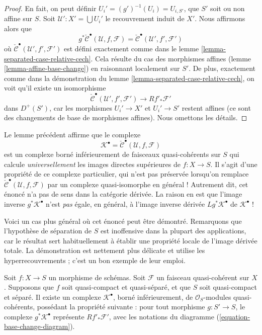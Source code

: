 \begin{proof}
En fait, on peut définir $U_i' = (g')^{-1}(U_i) = U_{i, S'}$,
que $S'$ soit ou non affine sur $S$.
Soit $\mathcal{U}' : X' = \bigcup U_i'$ le recouvrement induit de $X'$.
Nous affirmons alors que
$$
g^*\check{\mathcal{C}}^\bullet(\mathcal{U}, f, \mathcal{F})
=
\check{\mathcal{C}}^\bullet(\mathcal{U}', f', \mathcal{F}')
$$
où $\check{\mathcal{C}}^\bullet(\mathcal{U}', f', \mathcal{F}')$
est défini exactement comme dans le
lemme \ref{lemma-separated-case-relative-cech}.
Cela résulte du cas des morphismes affines
(lemme \ref{lemma-affine-base-change}) en raisonnant localement sur $S'$.
De plus, exactement comme dans la démonstration du
lemme \ref{lemma-separated-case-relative-cech},
on voit qu'il existe un isomorphisme
$$
\check{\mathcal{C}}^\bullet(\mathcal{U}', f', \mathcal{F}')
\longrightarrow
Rf'_*\mathcal{F}'
$$
dans $D^{+}(S')$, car les morphismes $U_i' \to X'$ et $U_i' \to S'$
restent affines (ce sont des changements de base de morphismes affines). Nous
omettons les détails.
\end{proof}

\noindent
Le lemme précédent affirme que le complexe
$$
\mathcal{K}^\bullet = \check{\mathcal{C}}^\bullet(\mathcal{U}, f, \mathcal{F})
$$
est un complexe borné inférieurement de faisceaux quasi-cohérents sur $S$ qui calcule
{\it universellement} les images directes supérieures de $f : X \to S$.
Il s'agit d'une propriété de ce complexe particulier,
qui n'est pas préservée lorsqu'on remplace
$\check{\mathcal{C}}^\bullet(\mathcal{U}, f, \mathcal{F})$ par
un complexe quasi-isomorphe en général ! Autrement dit, cet énoncé
n'a pas de sens dans la catégorie dérivée. La
raison en est que l'image inverse $g^*\mathcal{K}^\bullet$ n'est
{\it pas} égale, en général, à l'image inverse dérivée $Lg^*\mathcal{K}^\bullet$
de $\mathcal{K}^\bullet$ !

\medskip\noindent
Voici un cas plus général où cet énoncé peut être démontré.
Remarquons que l'hypothèse de séparation de $S$ est inoffensive dans la
plupart des applications, car le résultat sert habituellement à établir
une propriété locale de l'image dérivée
totale. La démonstration est nettement plus délicate et
utilise les hyperrecouvrements ; c'est un bon exemple de leur emploi.

\begin{lemma}
\label{lemma-hypercoverings}
Soit $f : X \to S$ un morphisme de schémas.
Soit $\mathcal{F}$ un faisceau quasi-cohérent sur $X$.
Supposons que $f$ soit quasi-compact et quasi-séparé, et
que $S$ soit quasi-compact et
séparé. Il existe un complexe $\mathcal{K}^\bullet$,
borné inférieurement, de $\mathcal{O}_S$-modules quasi-cohérents, possédant la
propriété suivante : pour tout morphisme
$g : S' \to S$, le complexe $g^*\mathcal{K}^\bullet$
représente $Rf'_*\mathcal{F}'$, avec les notations du
diagramme (\ref{equation-base-change-diagram}).
\end{lemma}

